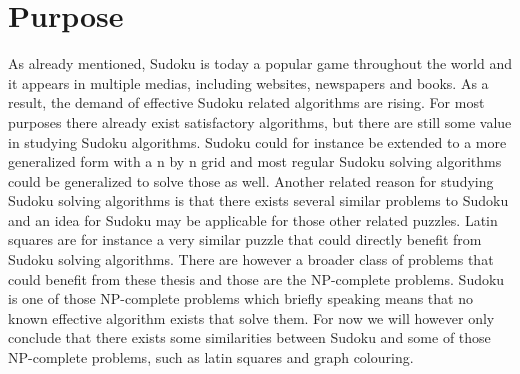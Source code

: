 \documentclass[a4paper,11pt]{kth-mag}
\begin{document}
\section{Purpose}
As already mentioned, Sudoku is today a popular game throughout the world and it appears 
in multiple medias, including websites, newspapers and books. 
As a result, the demand of effective Sudoku related algorithms are rising. 
For most purposes there already exist satisfactory algorithms, but there are 
still some value in studying Sudoku algorithms. 
Sudoku could for instance be extended to a more generalized form with 
a n by n grid and most regular Sudoku solving algorithms could be generalized 
to solve those as well. 
Another related reason for studying Sudoku solving algorithms is that there exists 
several similar problems to Sudoku and an idea for Sudoku may be applicable for 
those other related puzzles. 
Latin squares are for instance a very similar puzzle that could directly benefit 
from Sudoku solving algorithms. 
There are however a broader class of problems that could benefit from these thesis 
and those are the NP-complete problems. 
Sudoku is one of those NP-complete problems \cite{complexity} which briefly speaking means that 
no known effective algorithm exists that solve them. 
For now we will however only conclude that there exists some similarities between 
Sudoku and some of those NP-complete problems, such as latin squares and graph colouring. 

\end{document}
